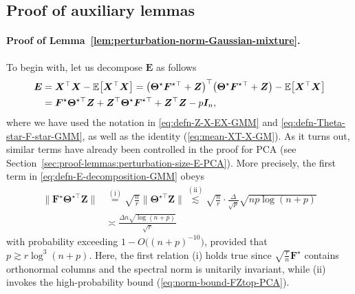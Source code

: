 


\subsection{Proof of auxiliary lemmas}
\label{sec:proof-auxiliary-lemmas-GM}



\paragraph{Proof of Lemma~\ref{lem:perturbation-norm-Gaussian-mixture}.}

To begin with, let us decompose $\bm{E}$ as follows
%
\begin{align}
	\bm{E} & =\bm{X}^{\top}\bm{X}-\mathbb{E}\big[\bm{X}^{\top}\bm{X}\big]
	  = \big(\bm{\Theta}^{\star} \bm{F}^{\star\top} +\bm{Z}\big)^{\top}\big(\bm{\Theta}^{\star} \bm{F}^{\star\top} +\bm{Z}\big)
		- \mathbb{E}\big[\bm{X}^{\top}\bm{X}\big] \notag\\
 	& = \bm{F}^{\star}\bm{\Theta}^{\star\top}\bm{Z} + \bm{Z}^{\top}\bm{\Theta}^{\star}\bm{F}^{\star\top} + \bm{Z}^{\top}\bm{Z}-p\bm{I}_n,
	\label{eq:defn-E-decomposition-GMM}
\end{align}
%
where we have used the notation in \eqref{eq:defn-Z-X-EX-GMM} and \eqref{eq:defn-Theta-star-F-star-GMM}, as well as the identity (\ref{eq:mean-XT-X-GM}).
As it turns out, similar terms have already been controlled in the proof for PCA (see Section~\ref{sec:proof-lemmas:perturbation-size-E-PCA}). More precisely, the first term in \eqref{eq:defn-E-decomposition-GMM} obeys
%
\begin{align*}
\big\|\bm{F}^{\star}\bm{\Theta}^{\star\top}\bm{Z}\big\| &
\overset{(\mathrm{i})}
{=}\sqrt{\frac{n}{r}}\big\|\bm{\Theta}^{\star\top}\bm{Z}\big\|
  \overset{(\mathrm{ii})}{\lesssim}  \sqrt{\frac{n}{r}}\cdot\frac{\Delta}{\sqrt{p}}\sqrt{np\log(n+p)} \\
	& \asymp  \frac{\Delta n\sqrt{\log(n+p)}}{\sqrt{r}}
\end{align*}
%
with probability exceeding $1-O\big((n+p)^{-10}\big)$, provided that $p\gtrsim r \log ^3 (n+p)$.
Here, the first relation (i) holds true since $\sqrt{\frac{r}{n}}\bm{F}^{\star}$ contains orthonormal columns and the spectral norm is unitarily invariant,
while (ii) invokes the high-probability bound (\ref{eq:norm-bound-FZtop-PCA}).
